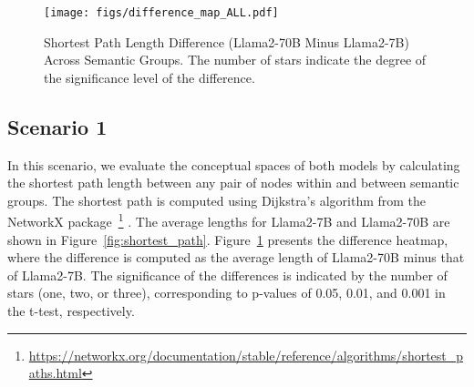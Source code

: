 \begin{figure}
    \centering
    \texttt{[image: figs/difference\_map\_ALL.pdf]}
    \caption{Shortest Path Length Difference (Llama2-70B Minus Llama2-7B) Across Semantic Groups. The number of stars indicate the degree of  the significance level of the difference.}
    \label{fig:difference_map}
\end{figure}



\subsection{Scenario 1}
In this scenario, we evaluate the conceptual spaces of both models by calculating the shortest path length between any pair of nodes within and between semantic groups. The shortest path is computed using Dijkstra's algorithm from the NetworkX package~\footnote{\url{https://networkx.org/documentation/stable/reference/algorithms/shortest_paths.html}}
. The average lengths for Llama2-7B and Llama2-70B are shown in Figure~\ref{fig:shortest_path}. Figure~\ref{fig:difference_map} presents the difference heatmap, where the difference is computed as the average length of Llama2-70B minus that of Llama2-7B. The significance of the differences is indicated by the number of stars (one, two, or three), corresponding to p-values of 0.05, 0.01, and 0.001 in the t-test, respectively.





